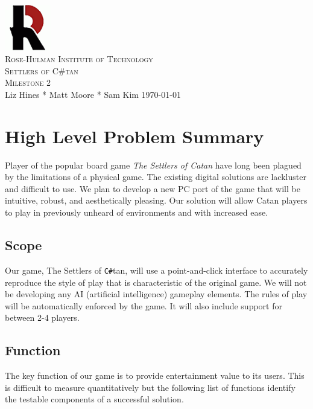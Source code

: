 \documentclass[12pt]{article}
\begin{document}
\begin{titlepage}
\begin{center}
\includegraphics[width=0.15\textwidth]{Images/logo}\\[1cm]
\textsc{\LARGE Rose-Hulman Institute of Technology}\\[1.5cm]
\textsc{\Large Settlers of C\#tan}\\[1.0cm]
\textsc{\Large Milestone 2}\\[1.0cm]
\Large Liz Hines \hspace{0.2cm}*\hspace{0.2cm}  Matt Moore \hspace{0.2cm}*\hspace{0.2cm} Sam	Kim
\vfill
\large \today
\end{center}
\end{titlepage}

\newpage
{\small \tableofcontents}
\newpage

\section{High Level Problem Summary}
Player of the popular board game \emph{The Settlers of Catan} have long been plagued by the limitations of a physical game. The existing digital solutions are lackluster and difficult to use. We plan to develop a new PC port of the game that will be intuitive, robust, and aesthetically pleasing. Our solution will allow Catan players to play in previously unheard of environments and with increased ease.

\subsection{Scope}
Our game, The Settlers of \verb!C#!tan, will use a point-and-click interface to accurately reproduce the style of play that is characteristic of the original game. We will not be developing any AI (artificial intelligence) gameplay elements. The rules of play will be automatically enforced by the game. It will also include support for between 2-4 players. 

\subsection{Function}
The key function of our game is to provide entertainment value to its users. This is difficult to measure quantitatively but the following list of functions identify the testable components of a successful solution.
\end{document}
